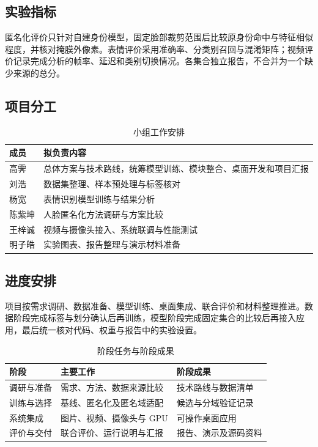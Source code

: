 \subsection{实验指标}
匿名化评价只针对自建身份模型，固定脸部裁剪范围后比较原身份命中与特征相似程度，并核对掩膜外像素。表情评价采用准确率、分类别召回与混淆矩阵；视频评价记录完成分析的帧率、延迟和类别切换情况。各集合独立报告，不合并为一个缺少来源的总分。

\begin{samepage}
\subsection{项目分工}
\begin{table}[H]
\centering
\caption{小组工作安排}
\label{tab:division}
\begin{tabularx}{\linewidth}{@{}lX@{}}
\toprule
成员 & 拟负责内容\\
\midrule
高霁 & 总体方案与技术路线，统筹模型训练、模块整合、桌面开发和项目汇报\\
刘浩 & 数据集整理、样本预处理与标签核对\\
杨宽 & 表情识别模型训练与结果分析\\
陈紫坤 & 人脸匿名化方法调研与方案比较\\
王梓诚 & 视频与摄像头接入、系统联调与性能测试\\
明子皓 & 实验图表、报告整理与演示材料准备\\
\bottomrule
\end{tabularx}
\end{table}
\end{samepage}

\subsection{进度安排}
项目按需求调研、数据准备、模型训练、桌面集成、联合评价和材料整理推进。数据阶段完成标签与划分确认后再训练，模型阶段完成固定集合的比较后再接入应用，最后统一核对代码、权重与报告中的实验设置。
\begin{table}[htbp]
\centering
\caption{阶段任务与阶段成果}
\label{tab:schedule}
\begin{tabularx}{\linewidth}{@{}lXX@{}}
\toprule
阶段 & 主要工作 & 阶段成果\\
\midrule
调研与准备 & 需求、方法、数据来源比较 & 技术路线与数据清单\\
训练与选择 & 基线、匿名化及匿名域适配 & 候选与分域验证记录\\
系统集成 & 图片、视频、摄像头与 GPU & 可操作桌面应用\\
评价与交付 & 联合评价、运行说明与汇报 & 报告、演示及源码资料\\
\bottomrule
\end{tabularx}
\end{table}
